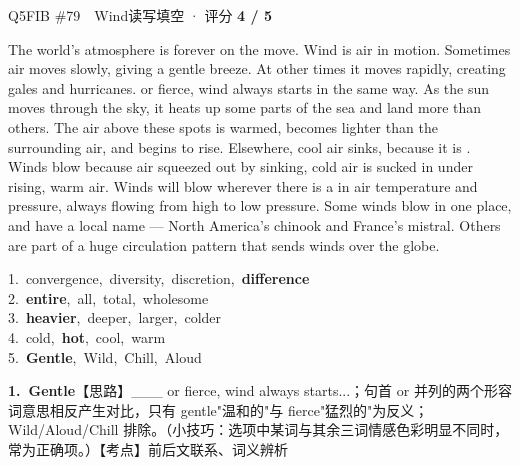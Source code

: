 \begin{qblock}{Q5\quad FIB \#79\ \ Wind}{读写填空 · 评分 \textcolor{cAccent}{\bfseries 4 / 5}}
\begin{promptbox}
The world's atmosphere is forever on the move. Wind is air in motion. Sometimes air moves slowly, giving a gentle breeze. At other times it moves rapidly, creating gales and hurricanes.  or fierce, wind always starts in the same way. As the sun moves through the sky, it heats up some parts of the sea and land more than others. The air above these  spots is warmed, becomes lighter than the surrounding air, and begins to rise. Elsewhere, cool air sinks, because it is . Winds blow because air squeezed out by sinking, cold air is sucked in under rising, warm air. Winds will blow wherever there is a  in air temperature and pressure, always flowing from high to low pressure. Some winds blow in one place, and have a local name --- North America's chinook and France's mistral. Others are part of a huge circulation pattern that sends winds over the  globe.
\end{promptbox}
{\small
1.\ convergence,\ diversity,\ discretion,\ \textbf{difference}\\
2.\ \textbf{entire},\ all,\ total,\ wholesome\\
3.\ \textbf{heavier},\ deeper,\ larger,\ colder\\
4.\ cold,\ \textbf{hot},\ cool,\ warm\\
5.\ \textbf{Gentle},\ Wild,\ Chill,\ Aloud}
\begin{notebox}\footnotesize
\textbf{1.\ Gentle}\quad【思路】\_\_\_ or fierce, wind always starts...；句首 or 并列的两个形容词意思相反产生对比，只有 gentle"温和的"与 fierce"猛烈的"为反义；Wild/Aloud/Chill 排除。（小技巧：选项中某词与其余三词情感色彩明显不同时，常为正确项。）【考点】前后文联系、词义辨析\par\smallskip

\end{notebox}
\end{qblock}
